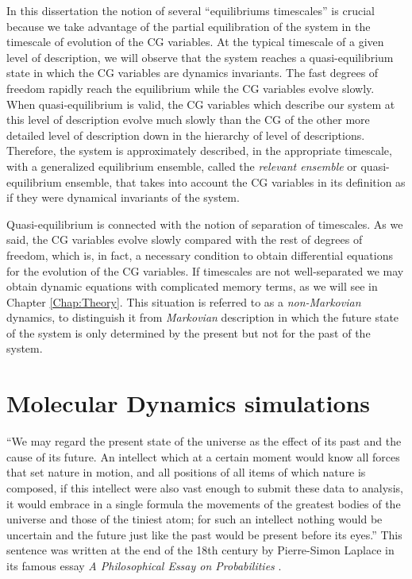 \documentclass[b5paper,openright,10pt]{book}
\begin{document}
In this dissertation the notion of several ``equilibriums timescales'' is crucial because we take advantage of the partial equilibration of the system in the timescale of evolution of the CG variables. 
At the typical timescale of a given level of description, we will observe that the system reaches a quasi-equilibrium state in which the CG variables are dynamics invariants. 
The fast degrees of freedom rapidly reach the equilibrium while the CG variables evolve slowly. 
When quasi-equilibrium is valid, the CG variables which describe our system at this level of description evolve much slowly than the CG of the other more detailed level of description down in the hierarchy of level of descriptions. 
Therefore, the system is approximately described, in the appropriate timescale, with a generalized equilibrium ensemble, called the {\it relevant ensemble} or quasi-equilibrium ensemble, that takes into account the CG variables in its definition as if they were dynamical invariants of the system.

Quasi-equilibrium is connected with the notion of separation of timescales. 
As we said, the CG variables evolve slowly compared with the rest of degrees of freedom, which is, in fact, a necessary condition to obtain differential equations for the evolution of the CG variables. 
If timescales are not well-separated we may obtain dynamic equations with complicated memory terms, as we will see in Chapter \ref{Chap:Theory}. 
This situation is referred to as a {\it non-Markovian} dynamics, to distinguish it from {\it Markovian} description in which the future state of the system is only determined by the present but not for the past of the system. 

\section{Molecular Dynamics simulations}
``We may regard the present state of the universe as the effect of its past and the cause of its future. An intellect which at a certain moment would know all forces that set nature in motion, and all positions of all items of which nature is composed, if this intellect were also vast enough to submit these data to analysis, it would embrace in a single formula the movements of the greatest bodies of the universe and those of the tiniest atom; for such an intellect nothing would be uncertain and the future just like the past would be present before its eyes.''
This sentence was written at the end of the 18th century by Pierre-Simon Laplace in its famous essay \textit{A Philosophical Essay on Probabilities} \cite{Laplace}.
\end{document}
